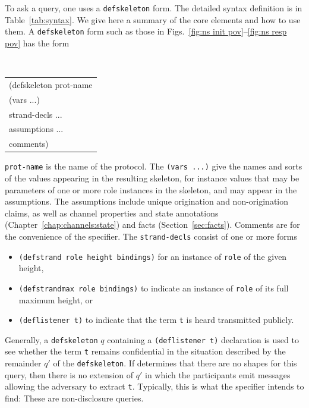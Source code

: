  To ask {\cpsa} a query, one uses a
\texttt{defskeleton} form.  The detailed syntax definition is in
Table~\ref{tab:syntax}.  We give here a summary of the core elements
and how to use them.  A \texttt{defskeleton} form such as those in
Figs.~\ref{fig:ns init pov}--\ref{fig:ns resp pov} has the form
%
\begin{center}
  \tt
  \begin{tabular}{l}
    (defskeleton prot-name \\
    \quad (vars ...) \\
    \quad strand-decls ... \\
    \quad assumptions ... \\
    \quad comments)
  \end{tabular}
\end{center}
%
\texttt{prot-name} is the name of the protocol.  The \texttt{(vars
  ...)} give the names and sorts of the values appearing in the
resulting skeleton, for instance values that may be parameters of one
or more role instances in the skeleton, and may appear in the
assumptions.  The assumptions include unique origination and
non-origination claims, as well as channel properties and state
annotations (Chapter~\ref{chap:channels:state}) and facts
(Section~\ref{sec:facts}).  Comments are for the convenience of the
specifier.  The \texttt{strand-decls} consist of one or more forms
%
\begin{itemize}
  \item \texttt{(defstrand role height bindings)} for an instance of
  \texttt{role} of the given height,
  \item \texttt{(defstrandmax role bindings)} to indicate an instance of
  \texttt{role} of its full maximum height, or
  \item \texttt{(deflistener t)} to indicate that the term \texttt{t}
  is heard transmitted publicly. 
\end{itemize}
%
Generally, a \texttt{defskeleton} $q$ containing a
\texttt{(deflistener t)} declaration is used to see whether the term
\texttt{t} remains confidential in the situation described by the
remainder $q'$ of the \texttt{defskeleton}.  If {\cpsa} determines that
there are no shapes for this query, then there is no extension of $q'$
in which the participants emit messages allowing the adversary to
extract \texttt{t}.  Typically, this is what the specifier intends to
find:  These are non-disclosure queries.  

